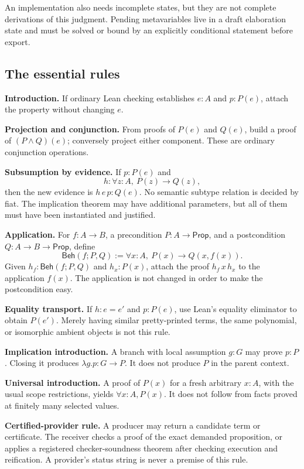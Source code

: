 \documentclass[11pt,a4paper]{article}
\theoremstyle{definition}
\theoremstyle{remark}
\newcommand{\Prop}{\ensuremath{\mathsf{Prop}}}
\newcommand{\Beh}{\mathsf{Beh}}
\begin{document}
An implementation also needs incomplete states, but they are not complete derivations of this judgment. Pending metavariables live in a draft elaboration state and must be solved or bound by an explicitly conditional statement before export.

\subsection{The essential rules}
\textbf{Introduction.} If ordinary Lean checking establishes $e:A$ and $p:P(e)$, attach the property without changing $e$.

\textbf{Projection and conjunction.} From proofs of $P(e)$ and $Q(e)$, build a proof of $(P\wedge Q)(e)$; conversely project either component. These are ordinary conjunction operations.

\textbf{Subsumption by evidence.} If $p:P(e)$ and
\[
 h:\forall z:A,\ P(z)\to Q(z),
\]
then the new evidence is $h\,e\,p:Q(e)$. No semantic subtype relation is decided by fiat. The implication theorem may have additional parameters, but all of them must have been instantiated and justified.

\textbf{Application.} For $f:A\to B$, a precondition $P:A\to\Prop$, and a postcondition $Q:A\to B\to\Prop$, define
\[
 \Beh(f;P,Q):=\forall x:A,\ P(x)\to Q(x,f(x)).
\]
Given $h_f:\Beh(f;P,Q)$ and $h_x:P(x)$, attach the proof $h_f\,x\,h_x$ to the application $f(x)$. The application is not changed in order to make the postcondition easy.

\textbf{Equality transport.} If $h:e=e'$ and $p:P(e)$, use Lean's equality eliminator to obtain $P(e')$. Merely having similar pretty-printed terms, the same polynomial, or isomorphic ambient objects is not this rule.

\textbf{Implication introduction.} A branch with local assumption $g:G$ may prove $p:P$. Closing it produces $\lambda g.p:G\to P$. It does not produce $P$ in the parent context.

\textbf{Universal introduction.} A proof of $P(x)$ for a fresh arbitrary $x:A$, with the usual scope restrictions, yields $\forall x:A,P(x)$. It does not follow from facts proved at finitely many selected values.

\textbf{Certified-provider rule.} A producer may return a candidate term or certificate. The receiver checks a proof of the exact demanded proposition, or applies a registered checker-soundness theorem after checking execution and reification. A provider's status string is never a premise of this rule.
\end{document}
